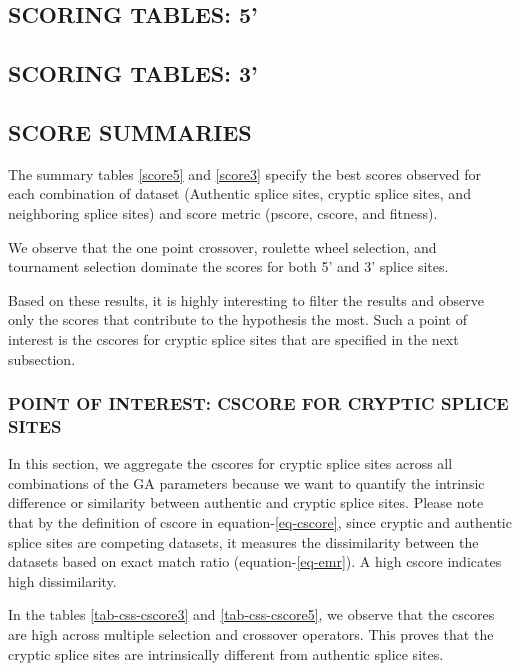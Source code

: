 \documentclass[12pt,a4paper]{article}
\begin{document}
	\subsection{SCORING TABLES: 5'}
	
	\subsection{SCORING TABLES: 3'}
	

	\subsection{SCORE SUMMARIES} 
	
	
	
	The summary tables \ref{score5} and \ref{score3} specify the best scores observed for each combination of dataset (Authentic splice sites, cryptic splice sites, and neighboring splice sites) and score metric (pscore, cscore, and fitness). \par
	We observe that the one point crossover, roulette wheel selection, and tournament selection dominate the scores for both 5' and 3' splice sites. \par
	Based on these results, it is highly interesting to filter the results and observe only the scores that contribute to the hypothesis the most. Such a point of interest is the cscores for cryptic splice sites that are specified in the next subsection.
	
	\subsubsection{POINT OF INTEREST: CSCORE FOR CRYPTIC SPLICE SITES}
	
	In this section, we aggregate the cscores for cryptic splice sites across all combinations of the GA parameters because we want to quantify the intrinsic difference or similarity between authentic and cryptic splice sites. Please note that by the definition of cscore in equation-\ref{eq-cscore}, since cryptic and authentic splice sites are competing datasets, it measures the dissimilarity between the datasets based on exact match ratio (equation-\ref{eq-emr}). A high cscore indicates high dissimilarity.
	
	
	
	In the tables \ref{tab-css-cscore3} and \ref{tab-css-cscore5}, we observe that the cscores are high across multiple selection and crossover operators. This proves that the cryptic splice sites are intrinsically different from authentic splice sites.
	
\end{document}
